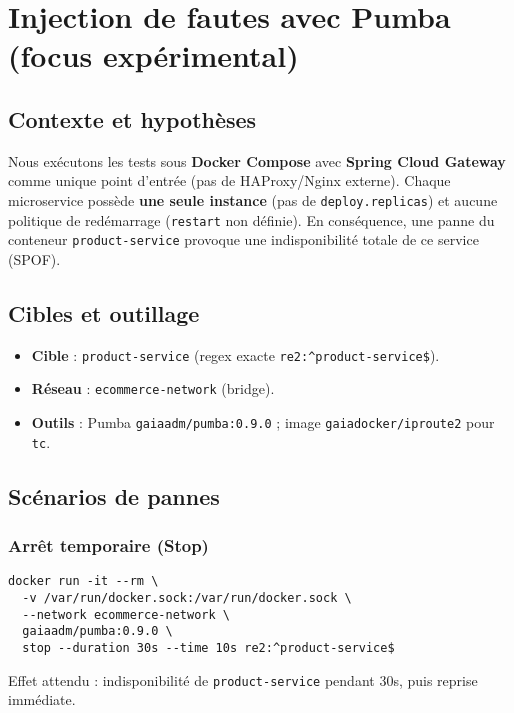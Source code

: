 \chapter{Injection de fautes avec Pumba (focus expérimental)}
\label{chap:pumba}

\section{Contexte et hypothèses}
Nous exécutons les tests sous \textbf{Docker Compose} avec \textbf{Spring Cloud Gateway} comme unique point d'entrée (pas de HAProxy/Nginx externe). 
Chaque microservice possède \textbf{une seule instance} (pas de \texttt{deploy.replicas}) et aucune politique de redémarrage (\texttt{restart} non définie). 
En conséquence, une panne du conteneur \texttt{product-service} provoque une indisponibilité totale de ce service (SPOF).

\section{Cibles et outillage}
\begin{itemize}
  \item \textbf{Cible} : \texttt{product-service} (regex exacte \texttt{re2:\^{}product-service\$}).
  \item \textbf{Réseau} : \texttt{ecommerce-network} (bridge).
  \item \textbf{Outils} : Pumba \texttt{gaiaadm/pumba:0.9.0} ; image \texttt{gaiadocker/iproute2} pour \texttt{tc}.
\end{itemize}

\section{Scénarios de pannes}
\subsection{Arrêt temporaire (Stop)}
\begin{lstlisting}[caption={Arrêt 30s (graceful downtime)}]
docker run -it --rm \
  -v /var/run/docker.sock:/var/run/docker.sock \
  --network ecommerce-network \
  gaiaadm/pumba:0.9.0 \
  stop --duration 30s --time 10s re2:^product-service$
\end{lstlisting}
Effet attendu : indisponibilité de \texttt{product-service} pendant 30s, puis reprise immédiate.

